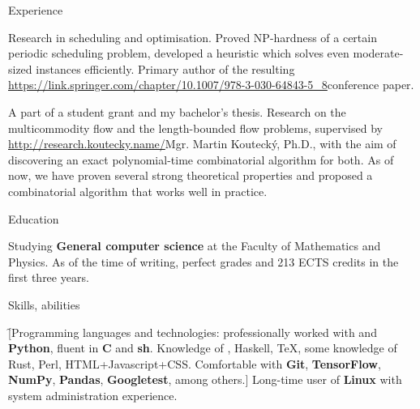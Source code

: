 \newif\ifdoublecolumn
\doublecolumnfalse




\newdimen\hei
\hei=1.5cm

\vskip 3mm
\doublecolumns

\sekce Experience

%
Research in scheduling and optimisation. Proved NP-hardness of a certain
periodic scheduling problem, developed a heuristic which solves even
moderate-sized instances efficiently. Primary author of the resulting \url{https://link.springer.com/chapter/10.1007/978-3-030-64843-5_8}{conference paper}.

%
A part of a student grant and my bachelor's thesis. Research on the
multicommodity flow and the length-bounded flow problems, supervised by
\url{http://research.koutecky.name/}{Mgr. Martin Koutecký, Ph.D.}, with the aim
of discovering an exact polynomial-time combinatorial algorithm for both. As of now, we have proven
several strong theoretical properties and proposed a combinatorial algorithm
that works well in practice.

\sekce Education


Studying {\bf General computer science} at the Faculty of Mathematics and
Physics. As of the time of writing, perfect grades and 213 ECTS credits in the
first three years.

\sekce Skills, abilities

\f[Programming languages and technologies: professionally worked with {\bf
\Cpp} and {\bf Python}, fluent in {\bf C} and {\bf sh}. Knowledge of \Cis,
Haskell, \TeX, some knowledge of Rust, Perl, HTML+Javascript+CSS. Comfortable
with {\bf Git}, {\bf TensorFlow}, {\bf NumPy}, {\bf Pandas}, {\bf Googletest},
among others.] Long-time user of {\bf Linux} with system administration
experience.


